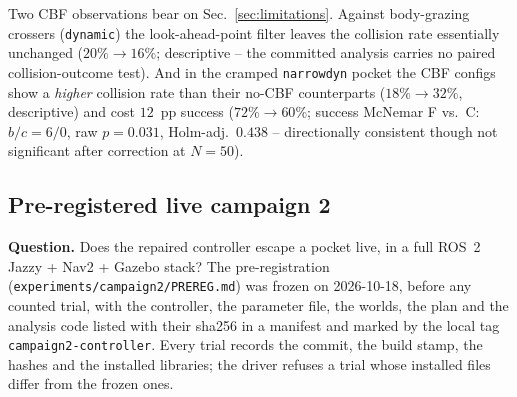 \documentclass[journal]{IEEEtran}
\begin{document}
Two CBF observations bear on Sec.~\ref{sec:limitations}. Against
body-grazing crossers (\texttt{dynamic}) the look-ahead-point filter
leaves the collision rate essentially unchanged
($20\%\!\to\!16\%$; descriptive -- the committed analysis carries no
paired collision-outcome test). And in the cramped \texttt{narrowdyn}
pocket the CBF configs show a \emph{higher} collision rate than their
no-CBF counterparts ($18\%\!\to\!32\%$, descriptive) and cost
$12$~pp success ($72\%\!\to\!60\%$; success McNemar F vs.\ C:
$b/c=6/0$, raw $p=0.031$, Holm-adj.\ $0.438$ -- directionally consistent
though not significant after correction at $N=50$).

\subsection{Pre-registered live campaign 2}
\label{sec:campaign2}

\textbf{Question.} Does the repaired controller escape a pocket live, in a full ROS~2
Jazzy + Nav2 + Gazebo stack? The pre-registration (\texttt{experiments/campaign2/PREREG.md})
was frozen on 2026-10-18, before any counted trial, with the controller, the parameter
file, the worlds, the plan and the analysis code listed with their sha256 in a manifest
and marked by the local tag \texttt{campaign2-controller}. Every trial records the commit,
the build stamp, the hashes and the installed libraries; the driver refuses a trial
whose installed files differ from the frozen ones.
\end{document}
